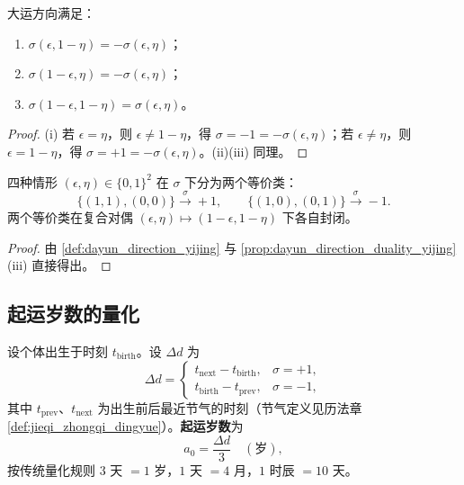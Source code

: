 \begin{proposition}[大运方向的对偶性]\label{prop:dayun_direction_duality_yijing}
大运方向满足：
\begin{enumerate}[label=(\roman*)]
    \item $\sigma(\epsilon,1-\eta)=-\sigma(\epsilon,\eta)$；
    \item $\sigma(1-\epsilon,\eta)=-\sigma(\epsilon,\eta)$；
    \item $\sigma(1-\epsilon,1-\eta)=\sigma(\epsilon,\eta)$。
\end{enumerate}
\end{proposition}

\begin{proof}
(i) 若 $\epsilon=\eta$，则 $\epsilon\neq 1-\eta$，得 $\sigma=-1=-\sigma(\epsilon,\eta)$；若 $\epsilon\neq\eta$，则 $\epsilon=1-\eta$，得 $\sigma=+1=-\sigma(\epsilon,\eta)$。(ii)(iii) 同理。
\end{proof}

\begin{corollary}[大运方向的等价类]\label{cor:dayun_direction_classes_yijing}
四种情形 $(\epsilon,\eta)\in\{0,1\}^2$ 在 $\sigma$ 下分为两个等价类：
\[
\{(1,1),(0,0)\}\xrightarrow{\sigma}+1,\qquad \{(1,0),(0,1)\}\xrightarrow{\sigma}-1.
\]
两个等价类在复合对偶 $(\epsilon,\eta)\mapsto(1-\epsilon,1-\eta)$ 下各自封闭。
\end{corollary}

\begin{proof}
由 \cref{def:dayun_direction_yijing} 与 \cref{prop:dayun_direction_duality_yijing}(iii) 直接得出。
\end{proof}

\subsection{起运岁数的量化}

\begin{definition}[起运岁数]\label{def:qiyun_age_yijing}
设个体出生于时刻 $t_{\text{birth}}$。设 $\Delta d$ 为
\[
\Delta d=\begin{cases}t_{\text{next}}-t_{\text{birth}},&\sigma=+1,\\t_{\text{birth}}-t_{\text{prev}},&\sigma=-1,\end{cases}
\]
其中 $t_{\text{prev}}$、$t_{\text{next}}$ 为出生前后最近节气的时刻（节气定义见历法章 \cref{def:jieqi_zhongqi_dingyue}）。\textbf{起运岁数}为
\[
a_0=\frac{\Delta d}{3}\quad(\text{岁}),
\]
按传统量化规则 $3$ 天 $=1$ 岁，$1$ 天 $=4$ 月，$1$ 时辰 $=10$ 天。
\end{definition}

